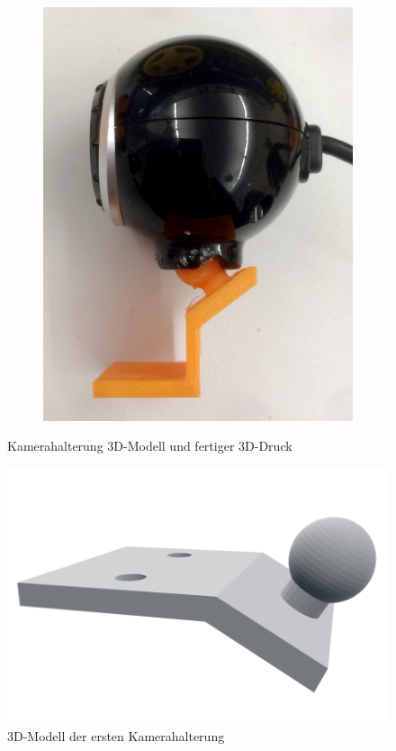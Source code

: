 \documentclass[a4paper, 12pt]{scrartcl}
\begin{document}
\begin{figure}[ht!]
\begin{subfigure}{.33\textwidth}
		\includegraphics[width=\textwidth]{../bilder_videos/Kamerahalterung.png}
	\end{subfigure}%
	\caption{Kamerahalterung 3D-Modell und fertiger 3D-Druck}
	\label{kamerahalterung}
\end{figure}

\begin{figure}[ht!] \centering
\includegraphics[width=.5\textwidth]{../3D-Druck_Modelle/Kamerahalterung_alt.png}
\caption{3D-Modell der ersten Kamerahalterung}
\label{kamerahalterung alt}
\end{figure}
\end{document}
